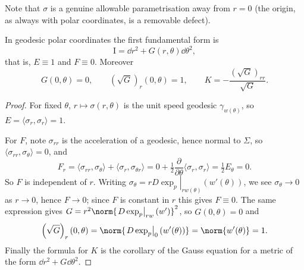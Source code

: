 Note that $\sigma$ is a genuine allowable parametrisation away from $r=0$ (the origin, as always with polar coordinates, is a removable defect).

\begin{center}
\end{center}

\begin{proposition}
    In geodesic polar coordinates the first fundamental form is
    $$
    \mathrm{I} = \dd r^2 + G(r,\theta) \dd \theta^2,
    $$
    that is, $E \equiv 1$ and $F \equiv 0$. Moreover
    $$
    G(0,\theta) = 0, \qquad \left(\sqrt{G}\right)_r(0,\theta) = 1, \qquad K = -\frac{\left(\sqrt G\right)_{rr}}{\sqrt G}.
    $$
\end{proposition}
\begin{proof}
    For fixed $\theta$, $r \mapsto \sigma(r,\theta)$ is the unit speed geodesic $\gamma_{w(\theta)}$, so $E = \langle\sigma_r,\sigma_r\rangle = 1$.

    For $F$, note $\sigma_{rr}$ is the acceleration of a geodesic, hence normal to $\Sigma$, so $\langle \sigma_{rr}, \sigma_\theta\rangle = 0$, and
    $$
    F_r = \langle \sigma_{rr}, \sigma_\theta\rangle + \langle \sigma_r, \sigma_{\theta r}\rangle = 0 + \tfrac12 \frac{\partial}{\partial\theta}\langle\sigma_r,\sigma_r\rangle = \tfrac12 E_\theta = 0.
    $$
    So $F$ is independent of $r$. Writing $\sigma_\theta = r\left.D\exp_p\right|_{rw(\theta)}(w'(\theta))$, we see $\sigma_\theta \rightarrow 0$ as $r \rightarrow 0$, hence $F \rightarrow 0$; since $F$ is constant in $r$ this gives $F \equiv 0$. The same expression gives $G = r^2 \norm{\left.D\exp_p\right|_{rw}(w')}^2$, so $G(0,\theta) = 0$ and
    $$
    \left(\sqrt G\right)_r(0,\theta) = \norm{\left.D\exp_p\right|_0(w'(\theta))} = \norm{w'(\theta)} = 1.
    $$
    Finally the formula for $K$ is the corollary of the Gauss equation for a metric of the form $\dd r^2 + G \dd\theta^2$.
\end{proof}

